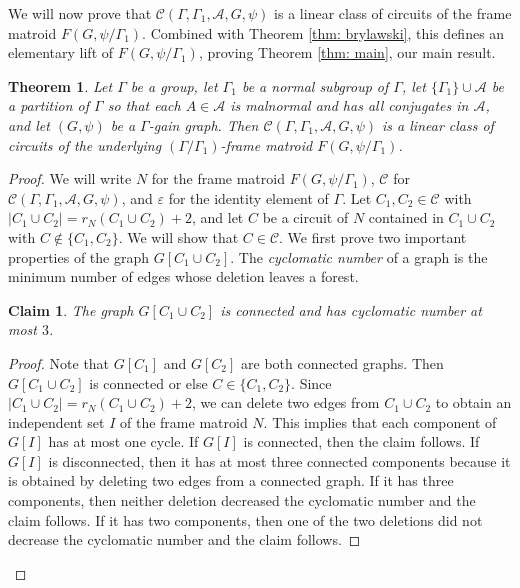 \documentclass[12pt]{article}
\newtheorem{theorem}{Theorem}[section]
\newtheorem{claim}{Claim}[theorem]
\theoremstyle{definition}
\newcommand{\cA}{\mathcal{A}}
\newcommand{\cC}{\mathcal{C}}
\newcommand{\ep}{\varepsilon}
\begin{document}
We will now prove that $\cC(\Gamma, \Gamma_1, \cA, G, \psi)$ is a linear class of circuits of the frame matroid $F(G, \psi/\Gamma_1)$.
Combined with Theorem \ref{thm: brylawski}, this defines an elementary lift of $F(G, \psi/\Gamma_1)$, proving Theorem \ref{thm: main}, our main result.


\begin{theorem} \label{thm: main precise}
Let $\Gamma$ be a group, let $\Gamma_1$ be a normal subgroup of $\Gamma$, let $\{\Gamma_1\} \cup \cA$ be a partition of $\Gamma$ so that each $A \in \cA$ is malnormal and has all conjugates in $\cA$, and let $(G, \psi)$ be a $\Gamma$-gain graph.
Then $\cC(\Gamma, \Gamma_1, \cA, G, \psi)$ is a linear class of circuits of the underlying $(\Gamma/\Gamma_1)$-frame matroid $F(G, \psi/\Gamma_1)$.
\end{theorem}
\begin{proof}
We will write $N$ for the frame matroid $F(G, \psi/\Gamma_1)$, $\cC$ for $\cC(\Gamma, \Gamma_1, \cA, G, \psi)$, and $\ep$ for the identity element of $\Gamma$.
Let $C_1, C_2 \in \cC$ with $|C_1 \cup C_2| = r_N(C_1 \cup C_2) + 2$, and let $C$ be a circuit of $N$ contained in $C_1 \cup C_2$ with $C \notin \{C_1, C_2\}$.
We will show that $C \in \cC$.
We first prove two important properties of the graph $G[C_1 \cup C_2]$.
The \emph{cyclomatic number} of a graph is the minimum number of edges whose deletion leaves a forest.

\begin{claim} \label{claim: cyclomatic number 3}
The graph $G[C_1 \cup C_2]$ is connected and has cyclomatic number at most $3$.
\end{claim}
\begin{proof}
Note that $G[C_1]$ and $G[C_2]$ are both connected graphs.
Then $G[C_1 \cup C_2]$ is connected or else $C \in \{C_1, C_2\}$.
Since $|C_1 \cup C_2| = r_N(C_1 \cup C_2) + 2$, we can delete two edges from $C_1 \cup C_2$ to obtain an independent set $I$ of the frame matroid $N$.
This implies that each component of $G[I]$ has at most one cycle.
If $G[I]$ is connected, then the claim follows.
If $G[I]$ is disconnected, then it has at most three connected components because it is obtained by deleting two edges from a connected graph.
If it has three components, then neither deletion decreased the cyclomatic number and the claim follows.
If it has two components, then one of the two deletions did not decrease the cyclomatic number and the claim follows.
\end{proof}



\end{proof}
\end{document}
